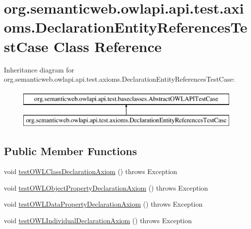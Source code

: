 \hypertarget{classorg_1_1semanticweb_1_1owlapi_1_1api_1_1test_1_1axioms_1_1_declaration_entity_references_test_case}{\section{org.\-semanticweb.\-owlapi.\-api.\-test.\-axioms.\-Declaration\-Entity\-References\-Test\-Case Class Reference}
\label{classorg_1_1semanticweb_1_1owlapi_1_1api_1_1test_1_1axioms_1_1_declaration_entity_references_test_case}
}
Inheritance diagram for org.\-semanticweb.\-owlapi.\-api.\-test.\-axioms.\-Declaration\-Entity\-References\-Test\-Case\-:\begin{figure}[H]
\begin{center}
\leavevmode
\includegraphics[height=2.000000cm]{classorg_1_1semanticweb_1_1owlapi_1_1api_1_1test_1_1axioms_1_1_declaration_entity_references_test_case}
\end{center}
\end{figure}
\subsection*{Public Member Functions}
\begin{DoxyCompactItemize}
\item 
void \hyperlink{classorg_1_1semanticweb_1_1owlapi_1_1api_1_1test_1_1axioms_1_1_declaration_entity_references_test_case_a9601a98766e3af0a1801a11038b3204d}{test\-O\-W\-L\-Class\-Declaration\-Axiom} ()  throws Exception 
\item 
void \hyperlink{classorg_1_1semanticweb_1_1owlapi_1_1api_1_1test_1_1axioms_1_1_declaration_entity_references_test_case_a8f834245b544b6f024b40d9066bd412a}{test\-O\-W\-L\-Object\-Property\-Declaration\-Axiom} ()  throws Exception 
\item 
void \hyperlink{classorg_1_1semanticweb_1_1owlapi_1_1api_1_1test_1_1axioms_1_1_declaration_entity_references_test_case_a88c67568f51fc23da8e4a795704797ca}{test\-O\-W\-L\-Data\-Property\-Declaration\-Axiom} ()  throws Exception 
\item 
void \hyperlink{classorg_1_1semanticweb_1_1owlapi_1_1api_1_1test_1_1axioms_1_1_declaration_entity_references_test_case_acf3ba47b8a1fea3aae7d47e93c3df9ff}{test\-O\-W\-L\-Individual\-Declaration\-Axiom} ()  throws Exception 
\end{DoxyCompactItemize}
